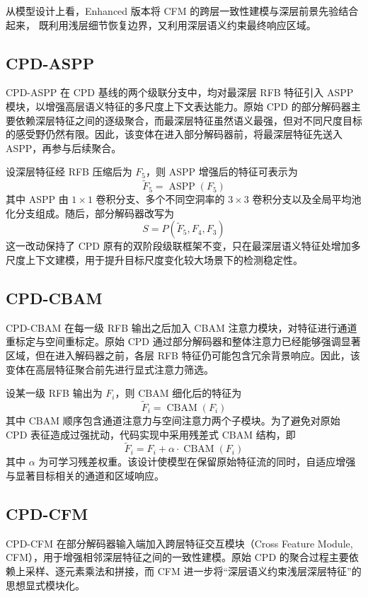 \documentclass[UTF8,a4paper,10pt]{ctexart}
\begin{document}
从模型设计上看，Enhanced 版本将 CFM 的跨层一致性建模与深层前景先验结合起来，
既利用浅层细节恢复边界，又利用深层语义约束最终响应区域。

\subsection{CPD-ASPP}

CPD-ASPP 在 CPD 基线的两个级联分支中，均对最深层 RFB 特征引入 ASPP 模块，以增强高层语义特征的多尺度上下文表达能力。原始 CPD 的部分解码器主要依赖深层特征之间的逐级聚合，而最深层特征虽然语义最强，但对不同尺度目标的感受野仍然有限。因此，该变体在进入部分解码器前，将最深层特征先送入 ASPP，再参与后续聚合。

设深层特征经 RFB 压缩后为 \(F_5\)，则 ASPP 增强后的特征可表示为
\[
\widetilde{F}_5 = \operatorname{ASPP}(F_5)
\]
其中 ASPP 由 \(1\times1\) 卷积分支、多个不同空洞率的 \(3\times3\) 卷积分支以及全局平均池化分支组成。随后，部分解码器改写为
\[
S = P(\widetilde{F}_5, F_4, F_3)
\]
这一改动保持了 CPD 原有的双阶段级联框架不变，只在最深层语义特征处增加多尺度上下文建模，用于提升目标尺度变化较大场景下的检测稳定性。

\subsection{CPD-CBAM}

CPD-CBAM 在每一级 RFB 输出之后加入 CBAM 注意力模块，对特征进行通道重标定与空间重标定。原始 CPD 通过部分解码器和整体注意力已经能够强调显著区域，但在进入解码器之前，各层 RFB 特征仍可能包含冗余背景响应。因此，该变体在高层特征聚合前先进行显式注意力筛选。

设某一级 RFB 输出为 \(F_i\)，则 CBAM 细化后的特征为
\[
\widetilde{F}_i = \operatorname{CBAM}(F_i)
\]
其中 CBAM 顺序包含通道注意力与空间注意力两个子模块。为了避免对原始 CPD 表征造成过强扰动，代码实现中采用残差式 CBAM 结构，即
\[
\widetilde{F}_i = F_i + \alpha \cdot \operatorname{CBAM}(F_i)
\]
其中 \(\alpha\) 为可学习残差权重。该设计使模型在保留原始特征流的同时，自适应增强与显著目标相关的通道和区域响应。

\subsection{CPD-CFM}

CPD-CFM 在部分解码器输入端加入跨层特征交互模块（Cross Feature Module, CFM），用于增强相邻深层特征之间的一致性建模。原始 CPD 的聚合过程主要依赖上采样、逐元素乘法和拼接，而 CFM 进一步将“深层语义约束浅层深层特征”的思想显式模块化。
\end{document}
